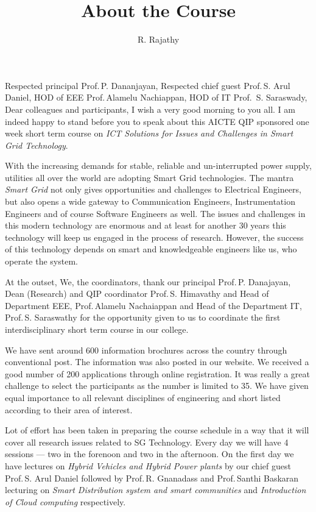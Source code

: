 \documentclass[12pt]{article}
\title{About the Course}
\author{R. Rajathy}
\begin{document}
  \maketitle
  \doublespacing
  Respected principal Prof.\,P. Dananjayan, Respected chief guest Prof.\,S. Arul Daniel, HOD of EEE Prof.\,Alamelu Nachiappan, HOD of IT Prof.\, S. Saraswady, Dear colleagues and participants, I wish a very good morning to you all. I am indeed happy to stand before you to speak about this AICTE QIP sponsored one week short term course on \emph{ICT Solutions for Issues and Challenges in Smart Grid Technology}.

 With the increasing demands for stable, reliable and un-interrupted power supply, utilities all over the world are adopting Smart Grid technologies. The mantra \emph{Smart Grid}  not only gives opportunities and challenges to Electrical Engineers, but also opens a wide gateway to Communication Engineers, Instrumentation Engineers and of course Software Engineers as well. The issues and challenges in this modern technology are enormous and at least for another 30 years this technology will keep us engaged in the process of research.  However, the success of this technology depends on smart and knowledgeable engineers like us, who operate the system.

At the outset, We, the coordinators, thank our principal Prof.\,P. Danajayan,  Dean (Research) and QIP coordinator Prof.\,S. Himavathy  and Head of Department EEE, Prof.\,Alamelu Nachaiappan and Head of the Department IT,  Prof.\,S. Saraswathy for the opportunity  given to us to coordinate the first interdisciplinary short term course in our college.

We have sent around 600 information brochures across the country through conventional post. The information was also posted in our website. We received a good number of 200 applications through online registration. It was really a great challenge to select the participants as the number is limited to 35. We have given equal importance to all relevant disciplines of engineering and short listed according to their area of interest.

Lot of effort has been taken in preparing the course schedule in a way that it will cover all research issues related to SG Technology. Every day we will have 4 sessions --- two in the forenoon and two in the afternoon. On the first day we have lectures on \emph{Hybrid Vehicles and Hybrid Power plants} by our chief guest Prof.\,S. Arul Daniel followed by Prof.\,R. Gnanadass and Prof.\,Santhi Baskaran lecturing on \emph{Smart Distribution system and smart communities} and \emph{Introduction of Cloud computing} respectively.
\end{document}
